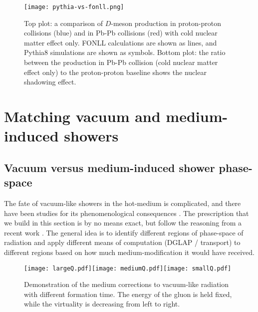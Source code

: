 \begin{figure}
\singlespacing
\centering
\texttt{[image: pythia-vs-fonll.png]}
\caption[Top plot: a comparison of $D$-meson production in proton-proton]{Top plot: a comparison of $D$-meson production in proton-proton collisions (blue) and in Pb-Pb collisions (red) with cold nuclear matter effect only. FONLL calculations are shown as lines, and Pythia8 simulations are shown as symbols. Bottom plot: the ratio between the production in Pb-Pb collision (cold nuclear matter effect only) to the proton-proton baseline shows the nuclear shadowing effect.}
\label{fig:pythia-fonll}
\end{figure}

\section{Matching vacuum and medium-induced showers}
\subsection{Vacuum versus medium-induced shower phase-space}
\label{section:match}
The fate of vacuum-like showers in the hot-medium is complicated, and there have been studies for its phenomenological consequences \cite{Cao:2017zih,PhysRevLett.120.232001,PhysRevLett.120.232001,Caucal:2018ofz}.
The prescription that we build in this section is by no means exact, but follow the reasoning from a recent work \cite{PhysRevLett.120.232001}.
The general idea is to identify different regions of phase-space of radiation and apply different means of computation (DGLAP / transport) to different regions based on how much medium-modification it would have received.

\begin{figure}
\singlespacing
\texttt{[image: largeQ.pdf]}\texttt{[image: mediumQ.pdf]}\texttt{[image: smallQ.pdf]}
\caption[Demonstration of the medium corrections to vacuum-like radiation]{Demonstration of the medium corrections to vacuum-like radiation with different formation time. The energy of the gluon is held fixed, while the virtuality is decreasing from left to right.}
\label{fig:vac-med-interface}
\end{figure}

